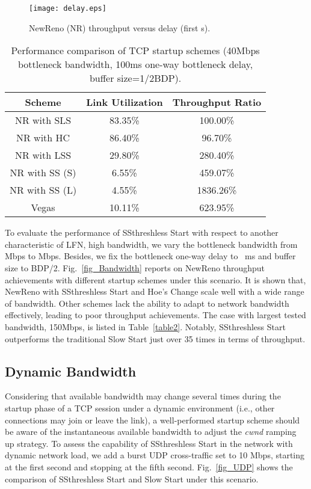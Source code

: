 \documentclass[12pt,onecolumn]{IEEEtran}
\begin{document}
\begin{figure}
\centering
\texttt{[image: delay.eps]}
\caption{NewReno (NR) throughput versus delay (first  s).}
\label{fig_Delay}
\end{figure}
\begin{table}[h]
\centering
\label{table3}\caption{\footnotesize Performance comparison of TCP startup schemes  (40Mbps bottleneck bandwidth, 100ms one-way bottleneck delay, buffer size=1/2BDP).} \begin{tabular}{|c|c|c|} \hline
Scheme & Link Utilization & Throughput Ratio\\ \hline \hline
NR with SLS & 83.35\%  &   100.00\% \\ \hline NR with HC & 86.40\%  &   96.70\%  \\ \hline
NR with LSS & 29.80\%  &   280.40\%  \\ \hline
NR with SS (S) &   6.55\% & 459.07\%  \\ \hline
NR with SS (L) & 4.55\%  &   1836.26\% \\ \hline
Vegas  & 10.11\%  &   623.95\% \\ \hline
\end{tabular}
\end{table}



To evaluate the performance of SSthreshless Start with respect to another
characteristic of LFN, high bandwidth, we vary the bottleneck bandwidth from
 Mbps to  Mbps. Besides, we fix the bottleneck one-way delay to
~ms and buffer size to BDP/2. Fig.~\ref{fig_Bandwidth} reports on NewReno
throughput achievements with different startup schemes under this scenario. It
is shown that, NewReno with SSthreshless Start and Hoe's Change scale well with
a wide range of bandwidth. Other schemes lack the ability to adapt to network
bandwidth effectively, leading to poor throughput achievements. The case with
largest tested bandwidth, 150Mbps, is listed in Table~\ref{table2}. Notably,
SSthreshless Start outperforms the traditional Slow Start just over 35 times in
terms of throughput.





\subsection{Dynamic Bandwidth}
Considering that available bandwidth may change several times during the
startup phase of a TCP session under a dynamic environment (i.e., other
connections may join or leave the link), a well-performed startup scheme should
be aware of the instantaneous available bandwidth to adjust the \emph{cwnd}
ramping up strategy. To assess the capability of SSthreshless Start in the
network with dynamic network load, we add a burst UDP cross-traffic set to
10 Mbps, starting at the first second and stopping at the fifth second.
Fig.~\ref{fig_UDP} shows the comparison of SSthreshless Start and Slow Start
under this scenario.
\end{document}
